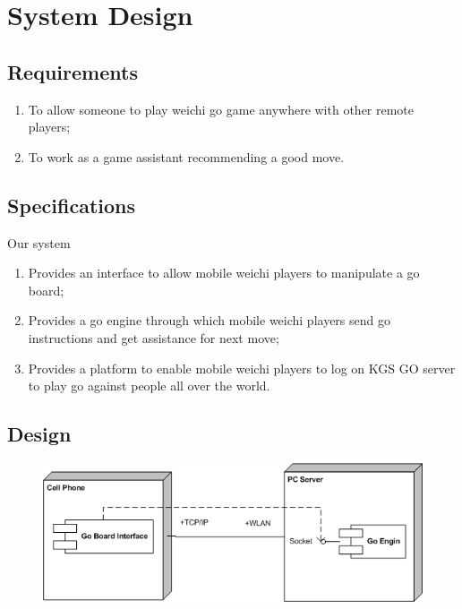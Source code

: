 \documentclass[acmtocl]{acmtrans2m}
\begin{document}
\section{System Design}

\subsection{Requirements}

\begin{enumerate}
 \item To allow someone to play weichi go game anywhere with other remote players;
 \item To work as a game assistant recommending a good move.
\end{enumerate}


\subsection{Specifications}

Our system
\begin{enumerate}
 \item Provides an interface to allow mobile weichi players to manipulate a go board;
 \item Provides a go engine through which mobile weichi players send go instructions and get assistance for next move;
 \item Provides a platform to enable mobile weichi players to log on KGS GO server to play go against people all over the world. 
\end{enumerate}

\subsection{Design}

\begin{figure}[t]
 \centering
 \includegraphics[width = \linewidth]{fig/deployment}
 \label{fig:deploy}
\end{figure}
\end{document}
